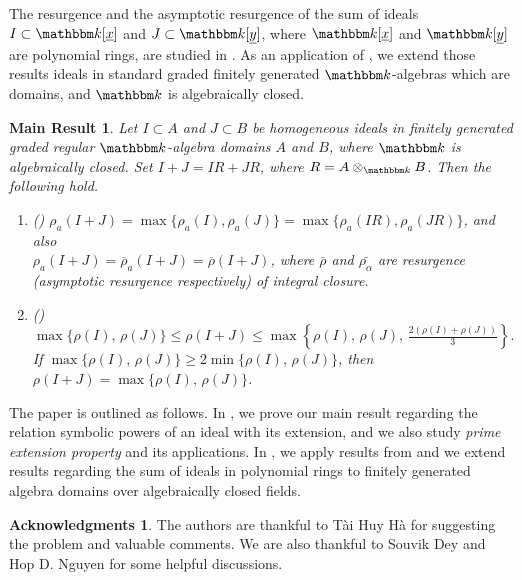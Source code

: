 \documentclass[12pt]{amsart}
\numberwithin{equation}{section}
\newtheorem{introthm*}{Main Result}
\theoremstyle{definition}
\newtheorem*{acknowledgment}{Acknowledgments}
\newcommand{\kk}{{\mathbbm k}}
\begin{document}
The resurgence and the asymptotic resurgence of the sum of ideals $I\subset \kk[\underline{x}]$ and $J\subset \kk[\underline{y}]$, where $\kk[\underline{x}]$ and $\kk[\underline{y}]$ are polynomial rings, are studied in \cite{fiberprojective, sharpbound}. 
As an application of , we extend those results ideals in standard graded finitely generated $\kk$-algebras which are domains, and $\kk$ is algebraically closed.
\begin{introthm*} Let $I \subset A $ and $J \subset B$ be homogeneous ideals in finitely generated graded regular $\kk$-algebra domains $A$ and $B$, where $\kk$ is algebraically closed.  Set $I+J=IR+JR$, where $R=A \otimes_{\kk} B$. Then the following hold.  
	\begin{enumerate}
		
		\item ()  $	\rho_{a}(I + J) = {\max}\{ \rho_a(I),  \rho_a(J) \} =\max\{\rho_a(IR),  \rho_a(JR)  \}$, and also\\
		$\rho_{a}(I + J) = \overline{\rho}_{a}(I + J) = \overline{\rho}(I + J)$, where $\bar{\rho}$ and $\bar{\rho_{\alpha}}$ are resurgence (asymptotic resurgence respectively) of integral closure.

		\item  () $ \displaystyle 
	\max \{ \rho(I), \, \rho(J) \} \leqslant \rho(I + J) \leqslant \max \left\{ \rho(I), \, \rho(J), \, \frac{2 (\rho(I) + \rho(J))}{3} \right\}.$  \\
	If $\max \{ \rho(I), \, \rho(J) \} \geqslant 2 \min \{ \rho(I), \, \rho(J) \}$, then $\rho(I + J) = \max \{ \rho(I), \, \rho(J) \}$.		
	\end{enumerate}	
\end{introthm*}

The paper is outlined as follows. In , we prove our main result regarding the relation symbolic powers of an ideal with its extension, and we also study \emph{prime extension property} and its applications. In , we apply results from  and we extend results regarding the sum of ideals in polynomial rings to finitely generated algebra domains over algebraically closed fields. 

\begin{acknowledgment}
The authors are thankful to Tài Huy Hà for suggesting the problem and valuable comments. We are also thankful to Souvik Dey and Hop D. Nguyen for some helpful discussions.
\end{acknowledgment}
\end{document}
